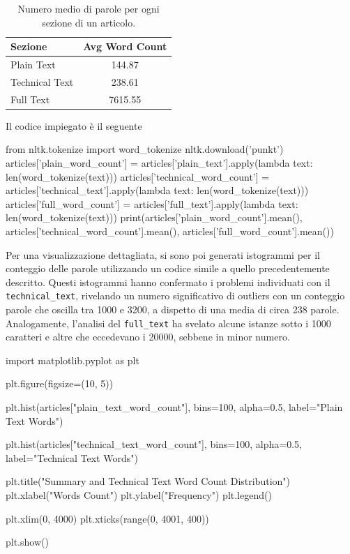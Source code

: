 \documentclass[12pt,a4paper,twoside,openright]{book}
\begin{document}
\begin{table}
\centering
\begin{tabular}{|l|c|}
\hline
Sezione         & Avg Word Count \\ \hline
Plain Text      & 144.87 \\ \hline
Technical Text  & 238.61 \\ \hline
Full Text       & 7615.55 \\ \hline
\end{tabular}
\caption{Numero medio di parole per ogni sezione di un articolo.}
\label{tab:avg_word_count}
\end{table}

Il codice impiegato è il seguente

\begin{python}[caption={Tokenizzazione delle istanze e calcolo dei valori medi.}, label={lst:py-tok-word-count}]
from nltk.tokenize import word_tokenize
nltk.download('punkt')
articles['plain_word_count'] = articles['plain_text'].apply(lambda text: len(word_tokenize(text)))
articles['technical_word_count'] = articles['technical_text'].apply(lambda text: len(word_tokenize(text)))
articles['full_word_count'] = articles['full_text'].apply(lambda text: len(word_tokenize(text)))
print(articles['plain_word_count'].mean(),
       articles['technical_word_count'].mean(),
       articles['full_word_count'].mean())
\end{python}

Per una visualizzazione dettagliata, si sono poi generati istogrammi per il conteggio delle parole utilizzando un codice simile a quello precedentemente descritto. Questi istogrammi hanno confermato i problemi individuati con il \texttt{technical\_text}, rivelando un numero significativo di outliers con un conteggio parole che oscilla tra 1000 e 3200, a dispetto di una media di circa 238 parole. Analogamente, l'analisi del \texttt{full\_text} ha svelato alcune istanze sotto i 1000 caratteri e altre che eccedevano i 20000, sebbene in minor numero.

\begin{python}[caption={Script per graficare le distribuzioni di frequenza del numero di parole.}, label={lst:py-freq-par}]
import matplotlib.pyplot as plt

plt.figure(figsize=(10, 5))

plt.hist(articles["plain_text_word_count"], bins=100, alpha=0.5, label="Plain Text Words")

plt.hist(articles["technical_text_word_count"], bins=100, alpha=0.5, label="Technical Text Words")

plt.title("Summary and Technical Text Word Count Distribution")
plt.xlabel("Words Count")
plt.ylabel("Frequency")
plt.legend()

plt.xlim(0, 4000)
plt.xticks(range(0, 4001, 400))

plt.show()
\end{python}
\end{document}
